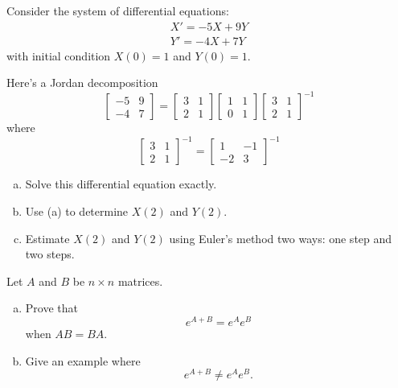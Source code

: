 \documentclass{article}
\newcommand{\inv}{^{-1}}
\begin{document}
\begin{problem}
    Consider the system of differential equations:
    \begin{align*}
        X' = -5X + 9Y\\
        Y' = -4X + 7Y
    \end{align*}
    with initial condition \(X(0) = 1\) and \(Y(0) = 1\).
    
    Here's a Jordan decomposition
    \[\begin{bmatrix}
        -5&9\\
        -4&7
    \end{bmatrix}=
    \begin{bmatrix}
        3&1\\2&1
    \end{bmatrix}
    \begin{bmatrix}
        1&1\\0&1
    \end{bmatrix}
    \begin{bmatrix}
        3&1\\2&1
    \end{bmatrix}\inv\]
    where
    \[
    \begin{bmatrix}
        3&1\\2&1
    \end{bmatrix}\inv=
    \begin{bmatrix}
        1&-1\\-2&3
    \end{bmatrix}\inv\]

    \begin{enumerate}[a)]
        \item Solve this differential equation exactly.
        \item Use (a) to determine \(X(2)\) and \(Y(2)\).
        \item Estimate \(X(2)\) and \(Y(2)\) using Euler's method two ways: one step and two steps.
    \end{enumerate}
\end{problem}


\begin{problem}
[Bonus]
    Let \(A\) and \(B\) be \(n\times n\) matrices.
    \begin{enumerate}[a)]
        \item Prove that
        \[e^{A+B} = e^Ae^B\]
        when \(AB=BA\).
        \item Give an example where
        \[e^{A+B} \neq e^Ae^B.\]
    \end{enumerate}
\end{problem}
\end{document}
